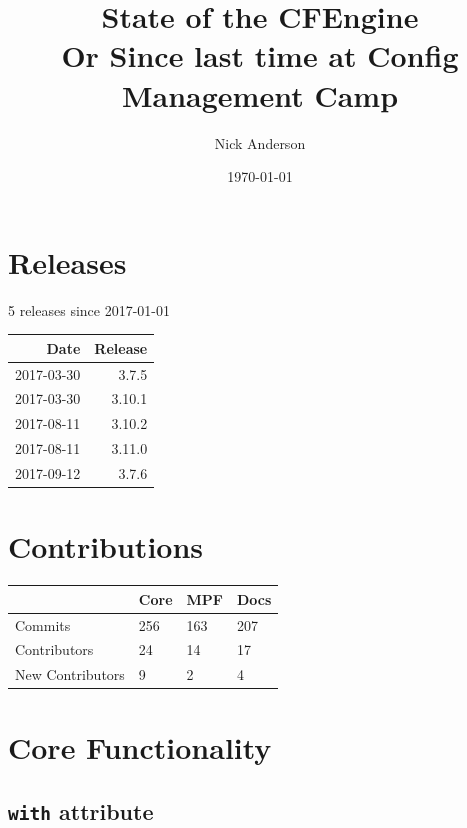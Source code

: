 \documentclass[11pt]{article}
\author{Nick Anderson}
\date{\today}
\title{State of the CFEngine\\\medskip
\large Or Since last time at Config Management Camp}
\begin{document}
\maketitle

\section*{}
\label{sec:orga9a5146}

\section*{Releases}
\label{sec:org6688799}
5 releases since 2017-01-01


\begin{center}
\begin{tabular}{rr}
Date & Release\\
\hline
2017-03-30 & 3.7.5\\
2017-03-30 & 3.10.1\\
2017-08-11 & 3.10.2\\
2017-08-11 & 3.11.0\\
2017-09-12 & 3.7.6\\
\end{tabular}
\end{center}

\section*{Contributions}
\label{sec:orgfb9dc79}
\begin{center}
\begin{tabular}{|l|l|l|l|}
\hline
 & Core & MPF & Docs \\
\hline
Commits & 256 & 163 & 207 \\
\hline
Contributors & 24 & 14 & 17 \\
\hline
New Contributors & 9 & 2 & 4 \\
\hline
\end{tabular}
\end{center}

\section*{Core Functionality}
\label{sec:org3b388c0}
\subsection*{\texttt{with} attribute}
\label{sec:org617f455}
\end{document}
